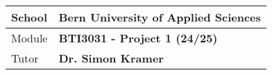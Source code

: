 \maketitle

\begin{table}[H]
    \centering
    \begin{tabularx}{0.6\textwidth}{l X}
        \toprule
        School & \textbf{Bern University of Applied Sciences} \\
        \midrule
        Module & \textbf{BTI3031 - Project 1 (24/25)}         \\
        \midrule
        Tutor  & \textbf{Dr. Simon Kramer}                    \\
        \bottomrule
    \end{tabularx}
    \label{tab:title-page}
\end{table}

\pagebreak